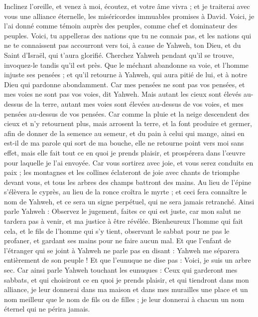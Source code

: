 \begin{multicols}{2}
Inclinez l'oreille, et venez à moi, écoutez, et votre âme vivra ; et je traiterai avec vous une alliance éternelle, les miséricordes immuables promises à David.
Voici, je l'ai donné comme témoin auprès des peuples, comme chef et dominateur des peuples.
Voici, tu appelleras des nations que tu ne connais pas, et les nations qui ne te connaissent pas accourront vers toi, à cause de Yahweh, ton Dieu, et du Saint d'Israël, qui t'aura glorifié.
Cherchez Yahweh pendant qu'il se trouve, invoquez-le tandis qu'il est près.
Que le méchant abandonne sa voie, et l'homme injuste ses pensées ; et qu'il retourne à Yahweh, qui aura pitié de lui, et à notre Dieu qui pardonne abondamment.
Car mes pensées ne sont pas vos pensées, et mes voies ne sont pas vos voies, dit Yahweh.
Mais autant les cieux sont élevés au-dessus de la terre, autant mes voies sont élevées au-dessus de vos voies, et mes pensées au-dessus de vos pensées.
Car comme la pluie et la neige descendent des cieux et n'y retournent plus, mais arrosent la terre, et la font produire et germer, afin de donner de la semence au semeur, et du pain à celui qui mange,
ainsi en est-il de ma parole qui sort de ma bouche, elle ne retourne point vers moi sans effet, mais elle fait tout ce en quoi je prends plaisir, et prospérera dans l'œuvre pour laquelle je l'ai envoyée.
Car vous sortirez avec joie, et vous serez conduits en paix ; les montagnes et les collines éclateront de joie avec chants de triomphe devant vous, et tous les arbres des champs battront des mains.
Au lieu de l'épine s'élèvera le cyprès, au lieu de la ronce croîtra le myrte ; et ceci fera connaître le nom de Yahweh, et ce sera un signe perpétuel, qui ne sera jamais retranché.
\VerseOne{}Ainsi parle Yahweh : Observez le jugement, faites ce qui est juste, car mon salut ne tardera pas à venir, et ma justice à être révélée.
Bienheureux l'homme qui fait cela, et le fils de l'homme qui s'y tient, observant le sabbat pour ne pas le profaner, et gardant ses mains pour ne faire aucun mal.
Et que l'enfant de l'étranger qui se joint à Yahweh ne parle pas en disant : Yahweh me séparera entièrement de son peuple ! Et que l'eunuque ne dise pas : Voici, je suis un arbre sec.
Car ainsi parle Yahweh touchant les eunuques : Ceux qui garderont mes sabbats, et qui choisiront ce en quoi je prends plaisir, et qui tiendront dans mon alliance,
je leur donnerai dans ma maison et dans mes murailles une place et un nom meilleur que le nom de fils ou de filles ; je leur donnerai à chacun un nom éternel qui ne périra jamais.

\end{multicols}
